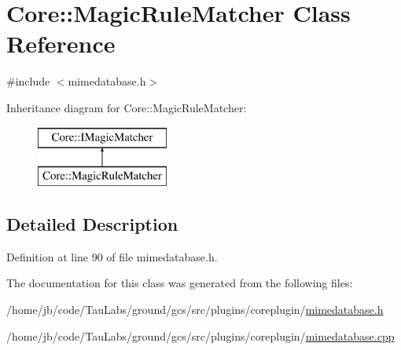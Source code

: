 \hypertarget{class_core_1_1_magic_rule_matcher}{\section{\-Core\-:\-:\-Magic\-Rule\-Matcher \-Class \-Reference}
\label{class_core_1_1_magic_rule_matcher}
}


{\ttfamily \#include $<$mimedatabase.\-h$>$}

\-Inheritance diagram for \-Core\-:\-:\-Magic\-Rule\-Matcher\-:\begin{figure}[H]
\begin{center}
\leavevmode
\includegraphics[height=2.000000cm]{class_core_1_1_magic_rule_matcher}
\end{center}
\end{figure}


\subsection{\-Detailed \-Description}


\-Definition at line 90 of file mimedatabase.\-h.



\-The documentation for this class was generated from the following files\-:\begin{DoxyCompactItemize}
\item 
/home/jb/code/\-Tau\-Labs/ground/gcs/src/plugins/coreplugin/\hyperlink{mimedatabase_8h}{mimedatabase.\-h}\item 
/home/jb/code/\-Tau\-Labs/ground/gcs/src/plugins/coreplugin/\hyperlink{mimedatabase_8cpp}{mimedatabase.\-cpp}\end{DoxyCompactItemize}
